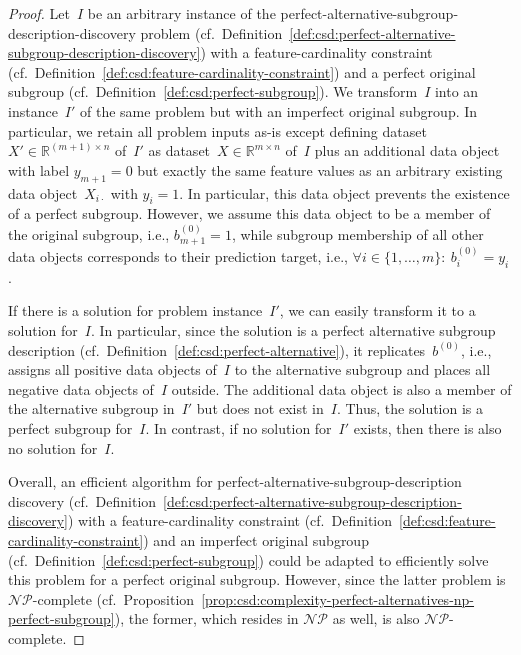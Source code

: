 \begin{proof}
	Let~$I$ be an arbitrary instance of the perfect-alternative-subgroup-description-discovery problem (cf.~Definition~\ref{def:csd:perfect-alternative-subgroup-description-discovery}) with a feature-cardinality constraint (cf.~Definition~\ref{def:csd:feature-cardinality-constraint}) and a perfect original subgroup (cf.~Definition~\ref{def:csd:perfect-subgroup}).
	We transform~$I$ into an instance~$I'$ of the same problem but with an imperfect original subgroup.
	In particular, we retain all problem inputs as-is except defining dataset~$X' \in \mathbb{R}^{(m + 1) \times n}$ of~$I'$ as dataset~$X \in \mathbb{R}^{m \times n}$ of~$I$ plus an additional data object with label $y_{m+1}=0$ but exactly the same feature values as an arbitrary existing data object~$X_{i\cdot}$ with $y_i=1$.
	In particular, this data object prevents the existence of a perfect subgroup.
	However, we assume this data object to be a member of the original subgroup, i.e., $b^{(0)}_{m+1} = 1$, while subgroup membership of all other data objects corresponds to their prediction target, i.e., $\forall i \in \{1, \dots, m\}:~ b^{(0)}_i = y_i$.
	
	If there is a solution for problem instance~$I'$, we can easily transform it to a solution for~$I$.
	In particular, since the solution is a perfect alternative subgroup description (cf.~Definition~\ref{def:csd:perfect-alternative}), it replicates~$b^{(0)}$, i.e., assigns all positive data objects of~$I$ to the alternative subgroup and places all negative data objects of~$I$ outside.
	The additional data object is also a member of the alternative subgroup in~$I'$ but does not exist in~$I$.
	Thus, the solution is a perfect subgroup for~$I$.
	In contrast, if no solution for~$I'$ exists, then there is also no solution for~$I$.
	
	Overall, an efficient algorithm for perfect-alternative-subgroup-description discovery (cf.~Definition~\ref{def:csd:perfect-alternative-subgroup-description-discovery}) with a feature-cardinality constraint (cf.~Definition~\ref{def:csd:feature-cardinality-constraint}) and an imperfect original subgroup (cf.~Definition~\ref{def:csd:perfect-subgroup}) could be adapted to efficiently solve this problem for a perfect original subgroup.
	However, since the latter problem is $\mathcal{NP}$-complete (cf.~Proposition~\ref{prop:csd:complexity-perfect-alternatives-np-perfect-subgroup}), the former, which resides in $\mathcal{NP}$ as well, is also $\mathcal{NP}$-complete.
\end{proof}

